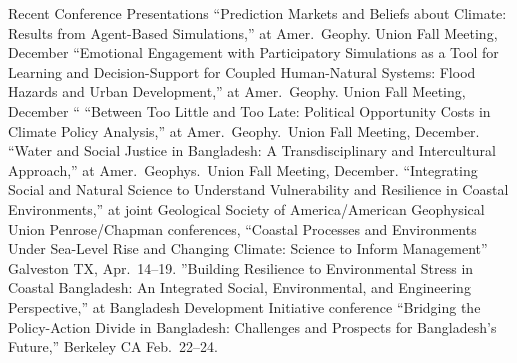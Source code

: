 %
%
\begin{rubric}{Recent Conference Presentations}%
\entry*[2015] ``Prediction Markets and Beliefs about Climate: Results from Agent-Based Simulations,'' at Amer.\ Geophy. Union Fall Meeting, December
\entry*[2015] ``Emotional Engagement with Participatory Simulations as a Tool for Learning and Decision-Support for Coupled Human-Natural Systems: Flood Hazards and Urban Development,''  at Amer.\ Geophy. Union Fall Meeting, December
\entry*[2015] ``
\entry*[2014]``Between Too Little and Too Late: Political Opportunity Costs in Climate Policy Analysis,'' at Amer.\ Geophy.\ Union Fall Meeting, December.
\entry*[2013]``Water and Social Justice in Bangladesh: A Transdisciplinary and Intercultural Approach,'' at Amer.\ Geophys.\ Union Fall Meeting, December.
\entry*[2013]``Integrating Social and Natural Science to Understand Vulnerability and Resilience in Coastal Environments,'' at  joint Geological Society of America/American Geophysical Union Penrose/Chapman conferences, ``Coastal Processes and Environments Under Sea-Level Rise and Changing Climate: Science to Inform Management'' Galveston TX, Apr.~14--19.
\entry*[2013]''Building Resilience to Environmental Stress in Coastal Bangladesh: An Integrated Social, Environmental, and Engineering Perspective,'' at Bangladesh Development Initiative conference ``Bridging the Policy-Action Divide in Bangladesh: Challenges and Prospects for Bangladesh's Future,'' Berkeley CA Feb.~22--24.
\end{rubric}
